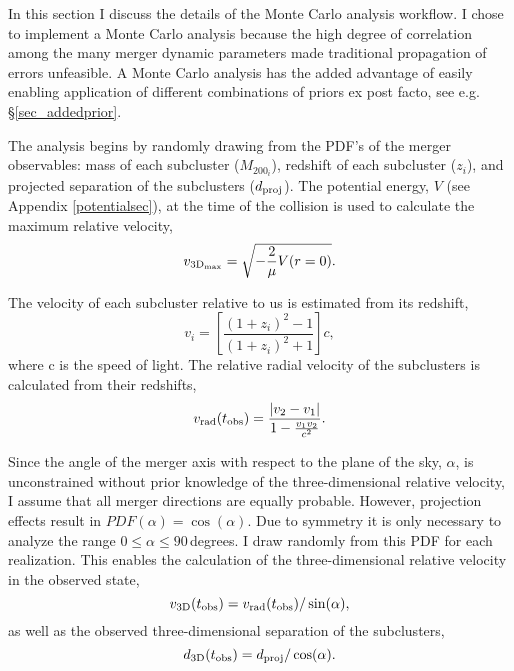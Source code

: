 \documentclass[12pt]{emulateapj}
\begin{document}
In this section I discuss the details of the Monte Carlo analysis workflow.
I chose to implement a Monte Carlo analysis because the high degree of correlation among the many merger dynamic parameters made traditional propagation of errors unfeasible.
A Monte Carlo analysis has the added advantage of easily enabling application of different combinations of priors ex post facto, see e.g. \S\ref{sec_addedprior}. 

The analysis begins by randomly drawing from the PDF's of the merger observables: mass of each subcluster ($M_{200_i}$), redshift of each subcluster ($z_i$), and projected separation of the subclusters ($d_{\rm proj}$).  The potential energy, $V$ (see Appendix \ref{potentialsec}), at the time of the collision is used to calculate the maximum relative velocity,
\begin{displaymath}
v_{\rm 3D_{max}} = \sqrt{-\frac{2}{\mu}V(r=0)}.
\end{displaymath}

The velocity of each subcluster relative to us is estimated from its redshift,
\begin{displaymath}
v_i = \left[\frac{(1+z_i)^2-1}{(1+z_i)^2+1}\right] c,
\end{displaymath}
where c is the speed of light.
The relative radial velocity of the subclusters is calculated from their redshifts,
\begin{displaymath}
v_{\rm rad}(t_{\rm obs}) = \frac{|v_2-v_1|}{1-\frac{v_1 v_2}{c^2}}.
\end{displaymath}

Since the angle of the merger axis with respect to the plane of the sky, $\alpha$, is unconstrained without prior knowledge of the three-dimensional relative velocity, I assume that all merger directions are equally probable.
However, projection effects result in $PDF(\alpha) = \cos(\alpha)$.
Due to symmetry it is only necessary to analyze the range $0\le\alpha\le 90$\,degrees.
I draw randomly from this PDF for each realization.
This enables the calculation of the three-dimensional relative velocity in the observed state, 
\begin{equation}
v_{\rm 3D}(t_{\rm obs}) = v_{\rm rad}(t_{\rm obs})/\sin(\alpha),
\label{eq_v3Dobs}
\end{equation}
as well as the observed three-dimensional separation of the subclusters, 
\begin{equation}
d_{\rm 3D}(t_{\rm obs}) = d_{\rm proj}/\cos(\alpha).
\label{eq_d3D}
\end{equation}
\end{document}
